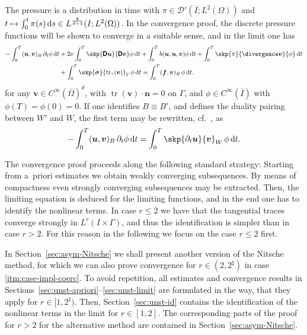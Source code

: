 \documentclass[reqno,a4paper]{amsart}
\def\tens#1{\pmb{\mathsf{#1}}}
\def\vec#1{\boldsymbol{#1}}
\def\tr{\mathop{\mathrm{tr}}\nolimits}
\def\d{{\rm d}}
\def\ds{\,\d s}
\def\dt{\,\d t}
\def\bf{\vec{f}}
\def\bn{\vec{n}}
\def\bu{\vec{u}}
\def\bv{\vec{v}}
\def\bsigma{\vec{\sigma}}
\def\BD{\tens{D}}
\begin{document}
\begin{remark}
	The pressure is a distribution in time with $\pi \in \mathcal{D}'(\overline I;L^2(\Omega))$ and $t \mapsto \int_0^t \pi(s) \ds  \in L^{\frac{8}{d+4}}(I;L^2(\Omega))$. 
	In the convergence proof,  the discrete pressure functions will be shown to converge in a suitable sense, and in the limit one has 
	\begin{equation}\label{eq:unst-lim-eq-1}
		\begin{aligned}
			- \int_0^T ( \bu, \bv)_{B}\, \partial_t \phi \dt  
			&+ 2 \nu \int_{0}^T \skp{\BD \bu}{ \BD \bv} \phi \dt 
			+ \int_0^T b(\bu,\bu,\bv) \phi \dt 
			+ \int_0^T \skp{\pi}{\divergence \bv}  
			{\phi} \dt 
			\\
			& + \int_{0}^T \skp{\bsigma}{\tr_\tau(\bv)}_{\Gamma} \, \phi \dt  
			=
			\int_{0}^T ( \bf, {\bv})_B \,\phi  \dt. 
		\end{aligned}
	\end{equation}
	for any $\bv \in C^{\infty}(\overline \Omega)^d$, with $\tr(\bv) \cdot \bn  = 0$ on $\Gamma$, and $\phi \in C^{\infty}(\overline I)$ with $\phi(T) = \phi(0) =  0$. 
	If one identifies $B \equiv B'$, and defines the duality pairing between $W'$ and $W$, the first term may be rewritten, cf.~\cite{BulicekMalekMaringova2023}, as 
	\begin{align*}
		- \int_0^T ( \bu, \bv)_{B}\, \partial_t \phi \dt   = 	 \int_0^T \skp{\partial_t  \bu}{ \bv}_{W}\,  \phi \dt.
	\end{align*}
\end{remark}

The convergence proof proceeds along the following standard strategy: 
Starting from a~priori estimates we obtain weakly converging subsequences. 
By means of compactness even strongly converging subsequences may be extracted. 
Then, the limiting equation is deduced for the limiting functions, and in the end one has to identify the nonlinear terms. 
In case $r\leq 2$ we have that the tangential traces converge strongly in $L^r(I\times \Gamma)$, and thus the identification is simpler than in case $r>2$. 
For this reason in the following we focus on the case $r \leq 2$ first. 

In Section~\ref{sec:asym-Nitsche} we shall present another version of the Nitsche method, for which we can also prove convergence for $r \in (2,2^\sharp)$ in case \ref{itm:case-impl-coerc}.
To avoid repetition, all estimates and convergence results in Sections~\ref{sec:unst-apriori}--\ref{sec:unst-limit} are formulated in the way, that they apply for $r \in [1,2^\sharp)$. 
Then, Section~\ref{sec:unst-id} contains the identification of the nonlinear terms in the limit for $r \in [1,2]$. 
The corresponding parts of the proof for $r> 2$ for the alternative method are contained in Section~\ref{sec:asym-Nitsche}. 
\end{document}
